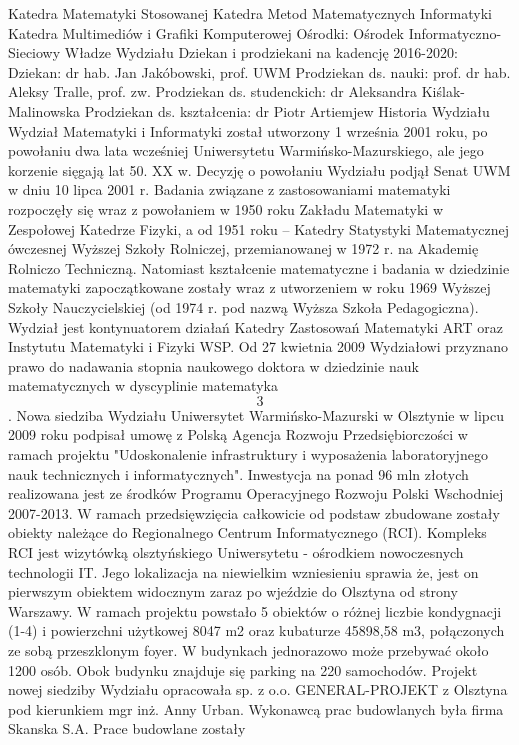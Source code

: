 \documentclass[a4paper,12pt]{article}
\begin{document}
Katedra Matematyki Stosowanej
Katedra Metod Matematycznych Informatyki
Katedra Multimediów i Grafiki Komputerowej
Ośrodki:
Ośrodek Informatyczno-Sieciowy
Władze Wydziału
Dziekan i prodziekani na kadencję 2016-2020:
Dziekan: dr hab. Jan Jakóbowski, prof. UWM
Prodziekan ds. nauki: prof. dr hab. Aleksy Tralle, prof. zw.
Prodziekan ds. studenckich: dr Aleksandra Kiślak-Malinowska
Prodziekan ds. kształcenia: dr Piotr Artiemjew
Historia Wydziału
Wydział Matematyki i Informatyki został utworzony 1 września 2001 roku, po powołaniu dwa lata wcześniej
Uniwersytetu Warmińsko-Mazurskiego, ale jego korzenie sięgają lat 50. XX w. Decyzję o powołaniu Wydziału
podjął Senat UWM w dniu 10 lipca 2001 r. Badania związane z zastosowaniami matematyki rozpoczęły się
wraz z powołaniem w 1950 roku Zakładu Matematyki w Zespołowej Katedrze Fizyki, a od 1951 roku –
Katedry Statystyki Matematycznej ówczesnej Wyższej Szkoły Rolniczej, przemianowanej w 1972 r. na
Akademię Rolniczo Techniczną. Natomiast kształcenie matematyczne i badania w dziedzinie matematyki
zapoczątkowane zostały wraz z utworzeniem w roku 1969 Wyższej Szkoły Nauczycielskiej (od 1974 r. pod
nazwą Wyższa Szkoła Pedagogiczna). Wydział jest kontynuatorem działań Katedry Zastosowań Matematyki
ART oraz Instytutu Matematyki i Fizyki WSP.
Od 27 kwietnia 2009 Wydziałowi przyznano prawo do nadawania stopnia naukowego doktora w dziedzinie
nauk matematycznych w dyscyplinie matematyka\[3\]
.
Nowa siedziba Wydziału
Uniwersytet Warmińsko-Mazurski w Olsztynie w lipcu 2009 roku podpisał umowę z Polską Agencja Rozwoju
Przedsiębiorczości w ramach projektu "Udoskonalenie infrastruktury i wyposażenia laboratoryjnego nauk
technicznych i informatycznych". Inwestycja na ponad 96 mln złotych realizowana jest ze środków Programu
Operacyjnego Rozwoju Polski Wschodniej 2007-2013. W ramach przedsięwzięcia całkowicie od podstaw
zbudowane zostały obiekty należące do Regionalnego Centrum Informatycznego (RCI).
Kompleks RCI jest wizytówką olsztyńskiego Uniwersytetu - ośrodkiem nowoczesnych technologii IT. Jego
lokalizacja na niewielkim wzniesieniu sprawia że, jest on pierwszym obiektem widocznym zaraz po wjeździe
do Olsztyna od strony Warszawy. W ramach projektu powstało 5 obiektów o różnej liczbie kondygnacji (1-4) i
powierzchni użytkowej 8047 m2 oraz kubaturze 45898,58 m3, połączonych ze sobą przeszklonym foyer. W
budynkach jednorazowo może przebywać około 1200 osób. Obok budynku znajduje się parking na 220
samochodów.
Projekt nowej siedziby Wydziału opracowała sp. z o.o. GENERAL-PROJEKT z Olsztyna pod kierunkiem mgr
inż. Anny Urban. Wykonawcą prac budowlanych była firma Skanska S.A. Prace budowlane zostały
\end{document}
